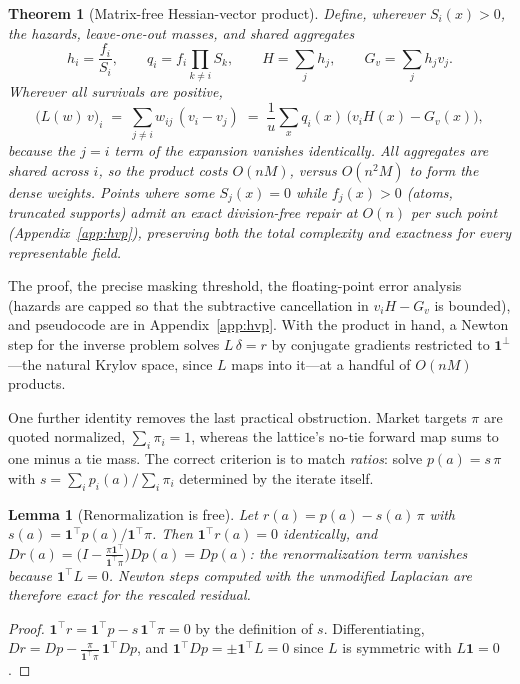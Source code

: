 \documentclass[11pt]{article}
\newtheorem{theorem}{Theorem}
\newtheorem{lemma}{Lemma}
\theoremstyle{definition}
\theoremstyle{remark}
\newcommand{\one}{\mathbf{1}}
\newcommand{\perpone}{\one^{\perp}}
\begin{document}
\begin{theorem}[Matrix-free Hessian-vector product]
\label{thm:hvp}
Define, wherever $S_i(x) > 0$, the hazards, leave-one-out masses, and
shared aggregates
\[
  h_i = \frac{f_i}{S_i}, \qquad
  q_i = f_i \prod_{k \ne i} S_k, \qquad
  H = \sum_j h_j, \qquad
  G_v = \sum_j h_j v_j .
\]
Wherever all survivals are positive,
\[
  \bigl(L(w)\,v\bigr)_i \;=\; \sum_{j \ne i} w_{ij}\,(v_i - v_j)
  \;=\; \frac{1}{u}\sum_{x} q_i(x)\,\bigl( v_i H(x) - G_v(x) \bigr),
\]
because the $j = i$ term of the expansion vanishes identically.  All
aggregates are shared across $i$, so the product costs $O(nM)$, versus
$O(n^2 M)$ to form the dense weights.  Points where some $S_j(x) = 0$ while
$f_j(x) > 0$ (atoms, truncated supports) admit an exact division-free repair
at $O(n)$ per such point (Appendix~\ref{app:hvp}), preserving both the total
complexity and exactness for every representable field.
\end{theorem}

The proof, the precise masking threshold, the floating-point error analysis
(hazards are capped so that the subtractive cancellation in $v_iH - G_v$ is
bounded), and pseudocode are in Appendix~\ref{app:hvp}.  With the product in
hand, a Newton step for the inverse problem solves $L\,\delta = r$ by
conjugate gradients restricted to $\perpone$---the natural Krylov space,
since $L$ maps into it---at a handful of $O(nM)$ products.

One further identity removes the last practical obstruction.  Market targets
$\pi$ are quoted normalized, $\sum_i \pi_i = 1$, whereas the lattice's no-tie
forward map sums to one minus a tie mass.  The correct criterion is to match
\emph{ratios}: solve $p(a) = s\,\pi$ with $s = \sum_i p_i(a) / \sum_i \pi_i$
determined by the iterate itself.

\begin{lemma}[Renormalization is free]
\label{lem:renorm}
Let $r(a) = p(a) - s(a)\,\pi$ with $s(a) = \one^\top p(a) / \one^\top \pi$.
Then $\one^\top r(a) = 0$ identically, and
$Dr(a) = \bigl(I - \tfrac{\pi \one^\top}{\one^\top \pi}\bigr) Dp(a) = Dp(a)$:
the renormalization term vanishes because $\one^\top L = 0$.  Newton steps
computed with the unmodified Laplacian are therefore exact for the rescaled
residual.
\end{lemma}

\begin{proof}
$\one^\top r = \one^\top p - s\,\one^\top\pi = 0$ by the definition of $s$.
Differentiating, $Dr = Dp - \frac{\pi}{\one^\top\pi}\,\one^\top Dp$, and
$\one^\top Dp = \pm\one^\top L = 0$ since $L$ is symmetric with
$L\one = 0$.
\end{proof}
\end{document}
